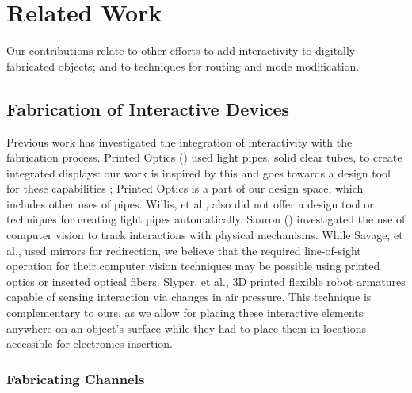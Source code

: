 \section{Related Work}

Our contributions relate to other efforts to add interactivity to digitally fabricated objects; and to techniques for routing and mode modification.  


\subsection{Fabrication of Interactive Devices}

Previous work has investigated the integration of interactivity with the fabrication process.  Printed Optics (\cite{Willis-printedoptics}) used light pipes, solid clear tubes, to create integrated displays: our work is inspired by this and goes towards a design tool for these capabilities ; Printed Optics is a part of our design space, which includes other uses of pipes.  Willis, et al., also did not offer a design tool or techniques for creating light pipes automatically.  Sauron (\cite{Savage-sauron}) investigated the use of computer vision to track interactions with physical mechanisms.  While Savage, et al., used mirrors for redirection, we believe that the required line-of-sight operation for their computer vision techniques may be possible using printed optics or inserted optical fibers.  Slyper, et al., \cite{Slyper-pressure} 3D printed flexible robot armatures capable of sensing interaction via changes in air pressure.  This technique is complementary to ours, as we allow for placing these interactive elements anywhere on an object's surface while they had to place them in locations accessible for electronics insertion.

\subsubsection{Fabricating Channels}

